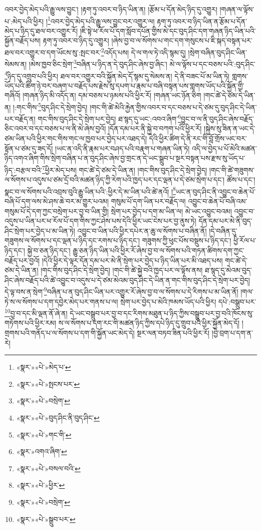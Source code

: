 འབར་བྱེད་མེད་པའི་རྒྱུ་ལས་བྱུང་། །རྟག་ཏུ་འབར་བ་ཉིད་ཡིན་ན། །རྩོམ་པ་དོན་མེད་ཉིད་དུ་འགྱུར། །གཞན་ལ་ལྟོས་པ་:མེད་པའི་ཕྱིར། །\footnote{«སྣར་»«པེ་»མེད་པ་}འབར་བྱེད་མེད་པའི་རྒྱུ་ལས་བྱུང་བར་འགྱུར་ལ། རྟག་ཏུ་འབར་བ་ཉིད་ཡིན་ན་རྩོམ་པ་དོན་མེད་པ་ཉིད་དུ་ཐལ་བར་འགྱུར་རོ། །ཇི་སྟེ་ཕ་རོལ་པོ་དག་སློབ་དཔོན་གྱིས་མེ་དང་བུད་ཤིང་དག་གཞན་ཉིད་ཡིན་པའི་སྐྱོན་བརྗོད་པས། རྟག་ཏུ་འབར་བ་ཉིད་དུ་འགྱུར། །ཞེས་བྱ་བ་ལ་སོགས་པ་གང་དག་གསུངས་པ་ཇི་སྐད་བསྟན་པར་ཐལ་བར་འགྱུར་བ་དག་ཡོངས་སུ་:སྤང་བར་\footnote{«སྣར་»«པེ་»སྤངས་པར་}འདོད་པས། དེ་ལ་གལ་ཏེ་འདི་སྙམ་དུ། །སྲེག་བཞིན་བུད་ཤིང་ཡིན་སེམས་ན། །མེས་ཁྱབ་ཅིང་སྲེག་\footnote{«སྣར་»«པེ་»བསྲེག་}བཞིན་པ་ཉིད་ན་དེ་བུད་ཤིང་ཞེས་བྱ་ཞིང་། མེ་ལ་ལྟོས་པ་དང་བཅས་པའི་:བུད་ཤིང་\footnote{«སྣར་»«པེ་»བུད་ཤིང་ནི་བུད་ཤིང་}ཉིད་དུ་འགྲུབ་པའི་ཕྱིར། ཐལ་བར་འགྱུར་བའི་སྐྱོན་མེད་དོ་སྙམ་དུ་སེམས་ན། དེ་ནི་བཟང་པོ་མ་ཡིན་ཏེ། གླགས་ཡོད་པའི་ཚིག་ཉེ་བར་བཞག་པ་བརྗོད་པས་རྗེས་སུ་དཔག་པ་རྣམ་པ་བཞི་བསྟན་པས་གླགས་ཡོད་པའི་སྐྱོན་གྱི་གཞིའོ། །གཞན་ཉིད་མི་འདོད་ན། དམ་བཅས་པ་ཉམས་པའི་ཕྱིར་རོ། །གཞན་ཡང་ཉོན་ཅིག །གང་ཚེ་དེ་ཙམ་དེ་ཡིན་ན། །:གང་གིས་\footnote{«སྣར་»«པེ་»གང་གི་}བུད་ཤིང་དེ་སྲེག་བྱེད། །གང་གི་ཚེ་མེའི་རྐྱེན་གྱིས་འབར་བ་དང་བཅས་པ་དེ་ཙམ་དུ་བུད་ཤིང་དེ་ཡིན་པར་བརྗོད་ན། གང་གིས་བུད་ཤིང་དེ་སྲེག་པར་བྱེད། ཐ་སྙད་དུ་ཡང་:འབའ་ཞིག་\footnote{«སྣར་»འགའ་ཞིག་}བྱུང་བ་ལ་ནི་བུད་ཤིང་ཞེས་བརྗོད་ཅིང་འབར་བ་དང་བཅས་པ་ལ་ནི་མེ་ཞེས་བྱའོ། །དོན་དམ་པར་ནི་སྐྱེ་བ་བཀག་པའི་ཕྱིར་རོ། །སྐྱེས་སུ་ཟིན་ན་ཡང་དེ་ཙམ་ཡིན་པའི་ཕྱིར་གང་གིས་གང་ལ་ཁྱབ་པར་བྱེད་པར་འཐད་དེ། དེའི་ཕྱིར་ཚིག་དེ་ནི་རང་གི་བློ་གྲོས་ཡང་བར་སྟོན་པ་ཙམ་དུ་ཟད་དོ། །ཡང་ན་འདི་ནི་རྣམ་པར་བཤད་པའི་བརྣག་པ་གཞན་ཡིན་ཏེ། འདི་ལ་བྱེད་པ་པོ་མེའི་མཚན་ཉིད་འགའ་ཞིག་གིས་སྲེག་བཞིན་པ་ན་བུད་ཤིང་ཞེས་བྱ་གྲང་ན་དེ་ཡང་སྒྲུབ་པ་སྔར་བསྟན་པས་རྫས་སུ་ཡོད་པ་ཉིད་:བརྩལ་བའི་\footnote{«སྣར་»«པེ་»བསལ་བའི་}ཕྱིར་མེད་པས། གང་ཚེ་དེ་ཙམ་དེ་ཡིན་ན། །གང་གིས་བུད་ཤིང་དེ་སྲེག་བྱེད། །གང་གི་ཚེ་གཟུགས་ལ་སོགས་པ་འདུས་པ་ཙམ་དྲོ་བའི་མཚན་ཉིད་ཀྱི་རེག་པའི་ཁྱད་པར་དང་ལྡན་པ་དེ་ཙམ་སྲེག་པ་དང་། ཚོས་པ་དང་། སྣང་བ་ལ་སོགས་པའི་འབྲས་བུའི་རྒྱུ་ཡིན་པའི་:ཕྱིར་དེ་མ་ཡིན་པའི་ཚེ་ནའོ། །\footnote{«སྣར་»«པེ་»ཕྱིར་}ཡང་ན་བུད་ཤིང་ནི་འབྱུང་བ་ཆེན་པོ་བཞི་པོ་དག་ལས་མེ་ཤས་ཆེ་བར་མ་གྱུར་པའམ། གསུམ་པོ་དག་ཡིན་པར་བརྗོད་ལ། འབྱུང་བ་ཆེན་པོ་བཞི་འམ་གསུམ་པོ་དེ་དག་ཀྱང་བསྲེག་པར་བྱ་བ་ཡིན་གྱི། སྲེག་པར་བྱེད་པ་དག་མ་ཡིན་ལ། མེ་ཡང་འབྱུང་བའམ། འབྱུང་བ་འདུས་པ་ཡིན་པར་ཕ་རོལ་པོ་དག་གིས་ཀྱང་ཤེས་པས་དེའི་ཕྱིར་ཡང་ངེས་པར་བྱ་ནུས་ཏེ། དོན་དམ་པར་མེ་ནི་བུད་ཤིང་སྲེག་པར་བྱེད་པ་མ་ཡིན་ཏེ། འབྱུང་བ་ཡིན་པའི་ཕྱིར་དཔེར་ན་ཆུ་ལ་སོགས་པ་བཞིན་ནོ། །དེ་བཞིན་དུ་གཟུགས་ལ་སོགས་པ་དང་ལྡན་པ་ཉིད་དང་རགས་པ་ཉིད་དང་། གཟུགས་ཀྱི་ཕུང་པོས་བསྡུས་པ་ཉིད་དང་། ཕྱི་རོལ་པ་ཉིད་དང་། སྐྱེ་བ་ཅན་ཉིད་དང་། རྒྱུ་ཅན་ཉིད་ཡིན་པའི་ཕྱིར་རོ་ཞེས་བྱ་བ་ལ་སོགས་པའི་གཏན་ཚིགས་དག་ཀྱང་བརྗོད་པར་བྱའོ། །དེའི་ཕྱིར་དེ་ལྟར་དོན་དམ་པར་མེ་ནི་སྲེག་པར་བྱེད་པ་ཉིད་ཡིན་པར་མི་འཐད་པས། གང་ཚེ་དེ་ཙམ་དེ་ཡིན་ན། །གང་གིས་བུད་ཤིང་དེ་སྲེག་བྱེད། །གང་གི་ཚེ་སྐྱེ་བའི་ཁྱད་པར་ལ་ལྟོས་ནས། ཐ་སྙད་དུ་མེའམ་བུད་ཤིང་ཞེས་བརྗོད་པའི་ཚེ་འབྱུང་བ་འདུས་པ་དེ་ཙམ་མེའམ་བུད་ཤིང་དེ་ཡིན་ན་གང་གིས་བུད་ཤིང་དེ་སྲེག་པར་བྱེད། དེ་ལྟ་བས་ན་སྲེག་\footnote{«སྣར་»«པེ་»བསྲེག་}བཞིན་པ་ན་བུད་ཤིང་ཡིན་པར་འགྱུར་རོ་ཞེས་བྱ་བ་ལ་སོགས་པ་དེ་རིགས་པ་མ་ཡིན་ནོ། །གལ་ཏེ་ས་ལ་སོགས་པ་དག་དབྱེར་མེད་པར་གནས་པ་ལ། སྲེག་པར་བྱེད་པ་མེའི་ཁམས་ཡོད་པའི་ཕྱིར། དཔེ་:བསྒྲུབ་པར་\footnote{«སྣར་»«པེ་»སྒྲུབ་པར་}བྱ་བ་དང་མི་ལྡན་ནོ་ཞེ་ན། དེ་ཡང་བསྒྲུབ་པར་བྱ་བ་དང་རིགས་མཐུན་པ་ཉིད་ཀྱིས་བསྒྲུབ་པར་བྱ་བའི་ཁོངས་སུ་གཏོགས་པའི་ཕྱིར་རམ། ས་ལ་སོགས་པ་དག་རང་གི་མཚན་ཉིད་ཀྱིས་དཔེ་ཉིད་དུ་གྲུབ་པའི་ཕྱིར་སྐྱོན་མེད་དོ། །གྲགས་པའི་གནོད་པ་ལ་སོགས་པ་དག་གི་སྐྱོན་ཡང་མེད་དེ། སྔར་ལན་བཏབ་ཟིན་པའི་ཕྱིར་རོ། །བྱེ་བྲག་པ་དག་ན་རེ། 